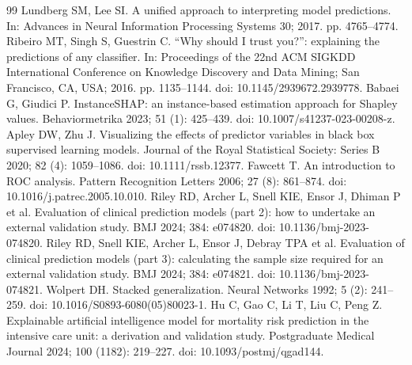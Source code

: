 \documentclass[a4paper,fleqn]{cas-dc}
\begin{document}
\begin{thebibliography}{99}
 Lundberg SM, Lee SI. A unified approach to interpreting model predictions. In: Advances in Neural Information Processing Systems 30; 2017. pp. 4765--4774.
 Ribeiro MT, Singh S, Guestrin C. ``Why should I trust you?'': explaining the predictions of any classifier. In: Proceedings of the 22nd ACM SIGKDD International Conference on Knowledge Discovery and Data Mining; San Francisco, CA, USA; 2016. pp. 1135--1144. doi: 10.1145/2939672.2939778.
 Babaei G, Giudici P. InstanceSHAP: an instance-based estimation approach for Shapley values. Behaviormetrika 2023; 51 (1): 425--439. doi: 10.1007/s41237-023-00208-z.
 Apley DW, Zhu J. Visualizing the effects of predictor variables in black box supervised learning models. Journal of the Royal Statistical Society: Series B 2020; 82 (4): 1059--1086. doi: 10.1111/rssb.12377.
 Fawcett T. An introduction to ROC analysis. Pattern Recognition Letters 2006; 27 (8): 861--874. doi: 10.1016/\allowbreak j.patrec.2005.10.010.
 Riley RD, Archer L, Snell KIE, Ensor J, Dhiman P et al. Evaluation of clinical prediction models (part 2): how to undertake an external validation study. BMJ 2024; 384: e074820. doi: 10.1136/bmj-2023-074820.
 Riley RD, Snell KIE, Archer L, Ensor J, Debray TPA et al. Evaluation of clinical prediction models (part 3): calculating the sample size required for an external validation study. BMJ 2024; 384: e074821. doi: 10.1136/bmj-2023-074821.
 Wolpert DH. Stacked generalization. Neural Networks 1992; 5 (2): 241--259. doi: 10.1016/S0893-6080(05)80023-1.
 Hu C, Gao C, Li T, Liu C, Peng Z. Explainable artificial intelligence model for mortality risk prediction in the intensive care unit: a derivation and validation study. Postgraduate Medical Journal 2024; 100 (1182): 219--227. doi: 10.1093/postmj/qgad144.\end{thebibliography}
\end{document}

